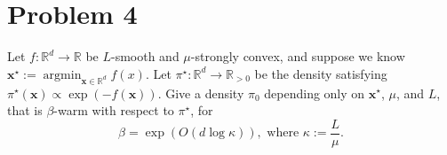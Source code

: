 \section*{Problem 4}

Let $f : \mathbb{R}^d \to \mathbb{R}$ be $L$-smooth and $\mu$-strongly convex, and suppose we know $\mathbf{x}^\star := \operatorname{argmin}_{\mathbf{x} \in \mathbb{R}^d} f(x)$.
Let $\pi^\star : \mathbb{R}^d \to \mathbb{R}_{>0}$ be the density satisfying $\pi^\star(\mathbf{x}) \propto \exp(-f(\mathbf{x}))$. Give a density $\pi_0$ depending only on $\mathbf{x}^\star$, $\mu$, and $L$, that is $\beta$-warm with respect to $\pi^\star$, for
\[
\beta = \exp(O(d \log \kappa)), \text{ where } \kappa := \frac{L}{\mu}.
\]
